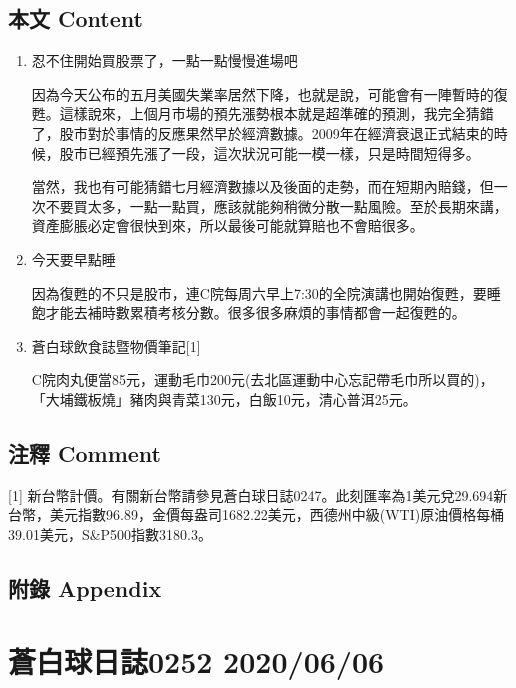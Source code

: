 \documentclass[
]{article}
\begin{document}
\hypertarget{ux672cux6587-content-4}{%
\subsection{本文 Content}\label{ux672cux6587-content-4}}

\begin{enumerate}
\def\labelenumi{\arabic{enumi}.}
\item
  忍不住開始買股票了，一點一點慢慢進場吧

  因為今天公布的五月美國失業率居然下降，也就是說，可能會有一陣暫時的復甦。這樣說來，上個月市場的預先漲勢根本就是超準確的預測，我完全猜錯了，股市對於事情的反應果然早於經濟數據。2009年在經濟衰退正式結束的時候，股市已經預先漲了一段，這次狀況可能一模一樣，只是時間短得多。

  當然，我也有可能猜錯七月經濟數據以及後面的走勢，而在短期內賠錢，但一次不要買太多，一點一點買，應該就能夠稍微分散一點風險。至於長期來講，資產膨脹必定會很快到來，所以最後可能就算賠也不會賠很多。
\item
  今天要早點睡

  因為復甦的不只是股市，連C院每周六早上7:30的全院演講也開始復甦，要睡飽才能去補時數累積考核分數。很多很多麻煩的事情都會一起復甦的。
\item
  蒼白球飲食誌暨物價筆記{[}1{]}

  C院肉丸便當85元，運動毛巾200元(去北區運動中心忘記帶毛巾所以買的)，「大埔鐵板燒」豬肉與青菜130元，白飯10元，清心普洱25元。
\end{enumerate}

\hypertarget{ux6ce8ux91cb-comment-4}{%
\subsection{注釋 Comment}\label{ux6ce8ux91cb-comment-4}}

{[}1{]}
新台幣計價。有關新台幣請參見蒼白球日誌0247。此刻匯率為1美元兌29.694新台幣，美元指數96.89，金價每盎司1682.22美元，西德州中級(WTI)原油價格每桶39.01美元，S\&P500指數3180.3。

\hypertarget{ux9644ux9304-appendix-4}{%
\subsection{附錄 Appendix}\label{ux9644ux9304-appendix-4}}

\hypertarget{ux84bcux767dux7403ux65e5ux8a8c0252-20200606}{%
\section{蒼白球日誌0252
2020/06/06}\label{ux84bcux767dux7403ux65e5ux8a8c0252-20200606}}
\end{document}
